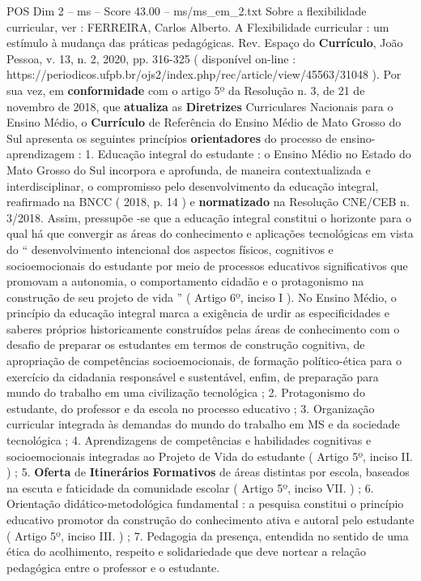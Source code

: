 \begin{textsample}{POS Dim 2 – ms – Score 43.00 – ms/ms\_em\_2.txt}
Sobre a flexibilidade curricular, ver : FERREIRA, Carlos Alberto.
A Flexibilidade curricular : um estímulo à mudança das práticas pedagógicas.
Rev.
Espaço do \textbf{Currículo}, João Pessoa, v. 13, n. 2, 2020, pp. 316-325 ( disponível on-line : https://periodicos.ufpb.br/ojs2/index.php/rec/article/view/45563/31048 ).
Por sua vez, em \textbf{conformidade} com o artigo 5º da Resolução n. 3, de 21 de novembro de 2018, que \textbf{atualiza} as \textbf{Diretrizes} Curriculares Nacionais para o Ensino Médio, o \textbf{Currículo} de Referência do Ensino Médio de Mato Grosso do Sul apresenta os seguintes princípios \textbf{orientadores} do processo de ensino-aprendizagem : 1.
Educação integral do estudante : o Ensino Médio no Estado do Mato Grosso do Sul incorpora e aprofunda, de maneira contextualizada e interdisciplinar, o compromisso pelo desenvolvimento da educação integral, reafirmado na BNCC ( 2018, p. 14 ) e \textbf{normatizado} na Resolução CNE/CEB n. 3/2018.
Assim, pressupõe -se que a educação integral constitui o horizonte para o qual há que convergir as áreas do conhecimento e aplicações tecnológicas em vista do “ desenvolvimento intencional dos aspectos físicos, cognitivos e socioemocionais do estudante por meio de processos educativos significativos que promovam a autonomia, o comportamento cidadão e o protagonismo na construção de seu projeto de vida ” ( Artigo 6º, inciso I ).
No Ensino Médio, o princípio da educação integral marca a exigência de urdir as especificidades e saberes próprios historicamente construídos pelas áreas de conhecimento com o desafio de preparar os estudantes em termos de construção cognitiva, de apropriação de competências socioemocionais, de formação político-ética para o exercício da cidadania responsável e sustentável, enfim, de preparação para mundo do trabalho em uma civilização tecnológica ; 2.
Protagonismo do estudante, do professor e da escola no processo educativo ; 3.
Organização curricular integrada às demandas do mundo do trabalho em MS e da sociedade tecnológica ; 4.
Aprendizagens de competências e habilidades cognitivas e socioemocionais integradas ao Projeto de Vida do estudante ( Artigo 5º, inciso II. ) ; 5. \textbf{Oferta} de \textbf{Itinerários} \textbf{Formativos} de áreas distintas por escola, baseados na escuta e faticidade da comunidade escolar ( Artigo 5º, inciso VII. ) ; 6.
Orientação didático-metodológica fundamental : a pesquisa constitui o princípio educativo promotor da construção do conhecimento ativa e autoral pelo estudante ( Artigo 5º, inciso III. ) ; 7.
Pedagogia da presença, entendida no sentido de uma ética do acolhimento, respeito e solidariedade que deve nortear a relação pedagógica entre o professor e o estudante.

\end{textsample}

